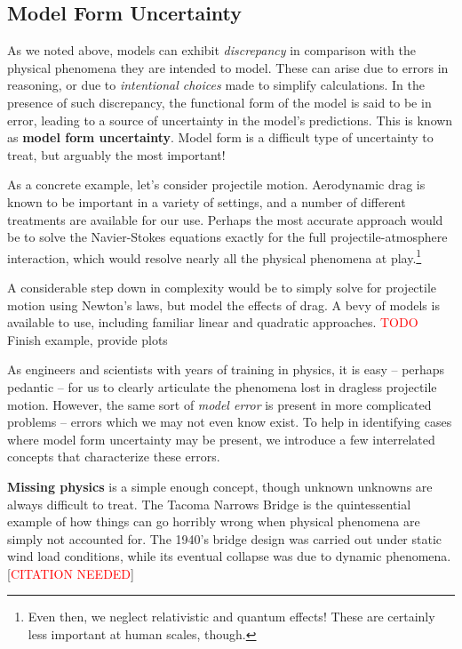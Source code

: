 \documentclass[../primer.tex]{subfiles}
\begin{document}
\subsection{Model Form Uncertainty}
As we noted above, models can exhibit \emph{discrepancy} in comparison with the
physical phenomena they are intended to model. These can arise due to errors in
reasoning, or due to \emph{intentional choices} made to simplify calculations.
In the presence of such discrepancy, the functional form of the model is said to
be in error, leading to a source of uncertainty in the model's predictions. This
is known as \textbf{model form uncertainty}. Model form is a difficult type of
uncertainty to treat, but arguably the most important!

As a concrete example, let's consider projectile motion. Aerodynamic drag is
known to be important in a variety of settings, and a number of different
treatments are available for our use. Perhaps the most accurate approach would
be to solve the Navier-Stokes equations exactly for the full
projectile-atmosphere interaction, which would resolve nearly all the physical
phenomena at play.\footnote{Even then, we neglect relativistic and quantum
  effects! These are certainly less important at human scales, though.}

A considerable step down in complexity would be to simply solve for projectile
motion using Newton's laws, but model the effects of drag. A bevy of models is
available to use, including familiar linear and quadratic approaches.
\textcolor{red}{TODO} Finish example, provide plots

As engineers and scientists with years of training in physics, it is easy --
perhaps pedantic -- for us to clearly articulate the phenomena lost in dragless
projectile motion. However, the same sort of \emph{model error} is present in
more complicated problems -- errors which we may not even know exist. To help in
identifying cases where model form uncertainty may be present, we introduce a
few interrelated concepts that characterize these errors.

\textbf{Missing physics} is a simple enough concept, though unknown unknowns are
always difficult to treat. The Tacoma Narrows Bridge is the quintessential
example of how things can go horribly wrong when physical phenomena are simply
not accounted for. The 1940's bridge design was carried out under static wind
load conditions, while its eventual collapse was due to dynamic
phenomena.[\textcolor{red}{CITATION NEEDED}]
\end{document}
